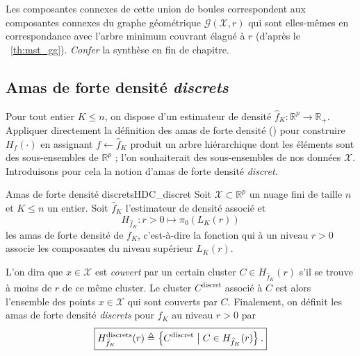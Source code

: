 Les composantes connexes de cette union de boules correspondent aux composantes connexes du graphe géométrique $\mathcal G(\mathcal X, r)$ qui sont elles-mêmes en correspondance avec l'arbre minimum couvrant élagué à $r$ (d'après le \Th~\ref{th:mst_gg}).
\emph{Confer} la synthèse en fin de chapitre.


\subsection{Amas de forte densité \emph{discrets}}

Pour tout entier $K \le n$, on dispose d'un estimateur de densité $\widehat f_{K} \colon \mathbb R^p \to \mathbb R_+$.
Appliquer directement la définition des amas de forte densité () pour construire $H_f(\cdot)$  en assignant $f \gets \widehat f_{K}$ produit un arbre hiérarchique dont les éléments sont des sous-ensembles de $\mathbb R^p$ ; l'on souhaiterait des sous-ensembles de nos données $\mathcal X$. Introduisons pour cela la notion d'amas de forte densité \emph{discret}.

\begin{Definition}{Amas de forte densité discrets}{HDC_discret}
Soit $\mathcal X \subset \mathbb R^p$ un nuage fini de taille $n$ et $K \le n$ un entier. 
Soit $\widehat f_K$ l'estimateur de densité \KNN associé et 
\[
H_{\widehat f_K} \colon r > 0\mapsto \pi_0\left( L_K(r)\right)
\]
les amas de forte densité de $f_K$, c'est-à-dire la fonction qui à un niveau $r > 0$ associe les composantes du niveau supérieur $L_K(r)$.

L'on dira que $x \in \mathcal X$ est \emph{couvert} par un certain cluster  $C \in H_{\widehat f_K}(r)$ s'il se trouve à moins de $r$ de ce même cluster. Le cluster $C^{\mathrm{discret}}$ associé à $C$ est alors l'ensemble des points $x\in \mathcal X$ qui sont couverts par $C$.
Finalement, on définit les amas de forte densité \emph{discrets} pour $f_K$ au niveau $r > 0$ par
\[
\boxed{
     H_{\widehat f_K}^{\mathrm{discrets}}(r) \triangleq  \left\{ C^{\mathrm{discret}} \bigm|  C \in  H_{\widehat f_K}(r)  \right\}.
    }
\]
\end{Definition}

